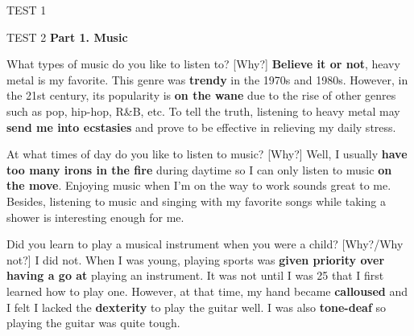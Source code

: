 \begin{glossarymc}[Cambridge 10]
\begin{test}{TEST 1}
\begin{VocabHighlights}
    \end{VocabHighlights}
    \end{test}

    \begin{test}{TEST 2}
    \noindent
    \textbf{Part 1. Music}
    \begin{qa}{What types of music do you like to listen to? [Why?]}
    \textbf{Believe it or not}, heavy metal is my favorite. This genre was \textbf{trendy} in the 1970s and 1980s. However, in the 21st century, its popularity is \textbf{on the wane} due to the rise of other genres such as pop, hip-hop, R\&B, etc. To tell the truth, listening to heavy metal may \textbf{send me into ecstasies} and prove to be effective in relieving my daily stress.
    \end{qa}

    \begin{qa}{At what times of day do you like to listen to music? [Why?]}
    Well, I usually \textbf{have too many irons in the fire} during daytime so I can only listen to music \textbf{on the move}. Enjoying music when I'm on the way to work sounds great to me. Besides, listening to music and singing with my favorite songs while taking a shower is interesting enough for me.
    \end{qa}

    \begin{qa}{Did you learn to play a musical instrument when you were a child? [Why?/Why not?]}
    I did not. When I was young, playing sports was \textbf{given priority over} \textbf{having a go at} playing an instrument. It was not until I was 25 that I first learned how to play one. However, at that time, my hand became \textbf{calloused} and I felt I lacked the \textbf{dexterity} to play the guitar well. I was also \textbf{tone-deaf} so playing the guitar was quite tough.
    \end{qa}


\end{test}
\end{glossarymc}
